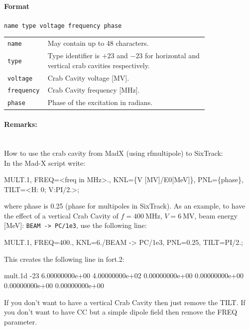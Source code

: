 \paragraph{Format} \texttt{name type voltage frequency phase}

\bigskip
\begin{tabular}{@{}lp{0.8\linewidth}}
    \texttt{name} & May contain up to 48 characters. \\
    \texttt{type} & Type identifier is $+23$ and $-23$ for horizontal and vertical crab cavities respectively. \\
    \texttt{voltage} & Crab Cavity voltage [MV]. \\
    \texttt{frequency} & Crab Cavity frequency [MHz]. \\
    \texttt{phase} & Phase of the excitation in radians.
\end{tabular}

\paragraph{Remarks:}~\\

\noindent How to use the crab cavity from MadX (using rfmultipole) to SixTrack:\\
\bigskip
\noindent In the Mad-X script write:
\begin{cverbatim}
MULT.1, FREQ=<freq in MHz>., KNL=\{V [MV]/E0[MeV]\}, PNL=\{phase\}, TILT=<H: 0; V:PI/2.>;
\end{cverbatim}
where phase is 0.25 (phase for multipoles in SixTrack).
As an example, to have the effect of a vertical Crab Cavity of $f=400~\mathrm{MHz}$, $V=6~\mathrm{MV}$, beam energy [MeV]: \texttt{BEAM -> PC/1e3}, use the following line:\\
\begin{cverbatim}
MULT.1, FREQ=400., KNL={6./BEAM -> PC/1e3}, PNL={0.25}, TILT=PI/2.;
\end{cverbatim}
This creates the following line in fort.2:
\begin{cverbatim}
mult.1d  -23  6.00000000e+00  4.00000000e+02  0.00000000e+00  0.00000000e+00  0.00000000e+00  0.00000000e+00
\end{cverbatim}
If you don’t want to have a vertical Crab Cavity then just remove the TILT.
If you don’t want to have CC but a simple dipole field then remove the FREQ parameter.

